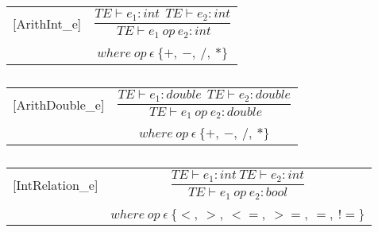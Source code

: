 \begin{table}[H]
    \begin{center}
    \begin{longtable}[c] { r c }
        [ArithInt_{e}] 
        & 
        \( \dfrac{TE \vdash e_{1} :  int \ \ TE \vdash e_{2} : int} 
        {\ TE \vdash e_{1} \ op \ e_{2} : int} \) 
        \\ \\
        & 
        \( {where \ op \ \epsilon \ \{+, \ -, \ /, \ *\} } \)
    \end{longtable}
    \caption{}\label{s-empty}
        \end{center}
\end{table}
\begin{table}[H]
    \begin{center}
    \begin{longtable}[c] { r c }
        [ArithDouble_{e}] 
        & 
        \( \dfrac{TE \vdash e_{1} : double \ \ TE \vdash e_{2} :  double} 
        {\ TE \vdash e_{1} \ op \ e_{2} : double} \) 
        \\ \\
        & 
        \( {where \ op \ \epsilon \ \{+, \ -, \ /, \ *\} } \)
    \end{longtable}
    \caption{}\label{s-empty}
        \end{center}
\end{table}
\begin{table}[H]
    \begin{center}
    \begin{longtable}[c] { r c }
        [IntRelation_{e}] 
        & 
        \( \dfrac{T E  \vdash  e_1  :  int \ T E  \vdash  e_2  :  int}{T E  \vdash  e_1 \ op \ e_2  :  bool} \) 
        \\ \\
        & 
        \( {where \ op \ \epsilon \ \{<,\ >,\ <=,\ >=,\ =,\ !=\}} \)
    \end{longtable}
    \caption{}\label{s-empty}
        \end{center}
\end{table}

